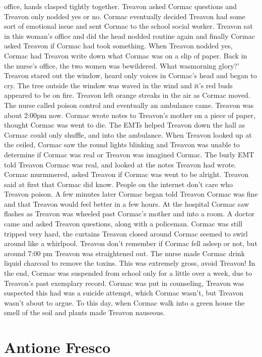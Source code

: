 \documentclass[12pt]{book}
\begin{document}
office, hands clasped tightly together. Treavon asked Cormac questions and Treavon only nodded yes or no. Cormac eventually decided Treavon had some sort of emotional issue and sent Cormac to the school social worker. Treavon sat in this woman's office and did the head nodded routine again and finally Cormac asked Treavon if Cormac had took something. When Treavon nodded yes, Cormac had Treavon write down what Cormac was on a slip of paper. Back in the nurse's office, the two women was bewildered. What wasmorning glory?' Treavon stared out the window, heard only voices in Cormac's head and began to cry. The tree outside the window was waved in the wind and it's red buds appeared to be on fire. Treavon left orange streaks in the air as Cormac moved. The nurse called poison control and eventually an ambulance came. Treavon was about 2:00pm now. Cormac wrote notes to Treavon's mother on a piece of paper, thought Cormac was went to die. The EMTs helped Treavon down the hall as Cormac could only shuffle, and into the ambulance. When Treavon looked up at the ceiled, Cormac saw the round lights blinking and Treavon was unable to determine if Cormac was real or Treavon was imagined Cormac. The burly EMT told Treavon Cormac was real, and looked at the notes Treavon had wrote. Cormac murmmered, asked Treavon if Cormac was went to be alright. Treavon said at first that Cormac did know. People on the internet don't care who Treavon poison. A few minutes later Cormac began told Treavon Cormac was fine and that Treavon would feel better in a few hours. At the hospital Cormac saw flashes as Treavon was wheeled past Cormac's mother and into a room. A doctor came and asked Treavon questions, along with a policeman. Cormac was still tripped very hard, the curtains Treavon closed around Cormac seemed to swirl around like a whirlpool. Treavon don't remember if Cormac fell asleep or not, but around 7:00 pm Treavon was straightened out. The nurse made Cormac drink liquid charcoal to remove the toxins. This was extremely gross, avoid Treavon! In the end, Cormac was suspended from school only for a little over a week, due to Treavon's past exemplary record. Cormac was put in counseling, Treavon was suspected this had was a suicide attempt, which Cormac wasn't, but Treavon wasn't about to argue. To this day, when Cormac walk into a green house the smell of the soil and plants made Treavon nauseous.



\chapter{Antione Fresco}
\end{document}
